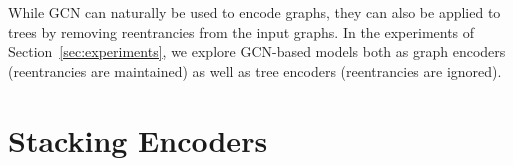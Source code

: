 \documentclass[11pt,a4paper]{article}
\begin{document}
While GCN can naturally be used to encode graphs, they can also be applied to trees by removing reentrancies from the input graphs. In the experiments of Section~\ref{sec:experiments}, we explore GCN-based models both as graph encoders (reentrancies are maintained) as well as tree encoders (reentrancies are ignored). 

\section{Stacking Encoders}
\label{sec:stack}
\end{document}
